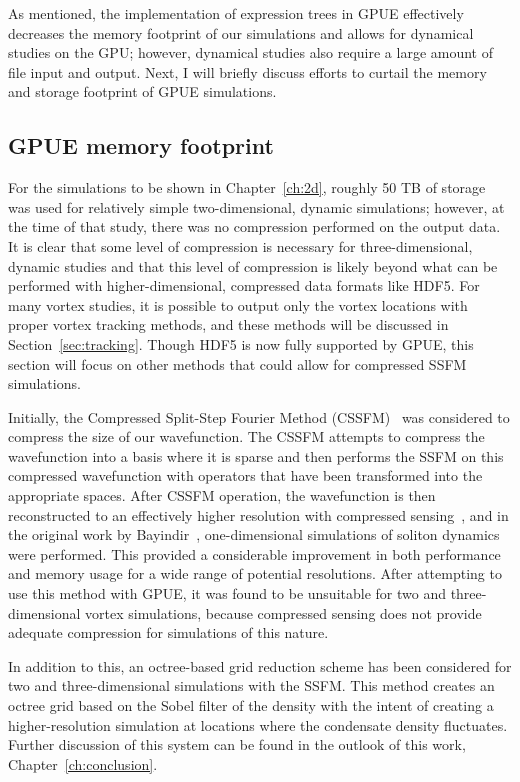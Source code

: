 As mentioned, the implementation of expression trees in GPUE effectively decreases the memory footprint of our simulations and allows for dynamical studies on the GPU; however, dynamical studies also require a large amount of file input and output.
Next, I will briefly discuss efforts to curtail the memory and storage footprint of GPUE simulations.

\subsection{GPUE memory footprint}

For the simulations to be shown in Chapter~\ref{ch:2d}, roughly 50 TB of storage was used for relatively simple two-dimensional, dynamic simulations; however, at the time of that study, there was no compression performed on the output data.
It is clear that some level of compression is necessary for three-dimensional, dynamic studies and that this level of compression is likely beyond what can be performed with higher-dimensional, compressed data formats like HDF5.
For many vortex studies, it is possible to output only the vortex locations with proper vortex tracking methods, and these methods will be discussed in Section~\ref{sec:tracking}.
Though HDF5 is now fully supported by GPUE, this section will focus on other methods that could allow for compressed SSFM simulations.

Initially, the Compressed Split-Step Fourier Method (CSSFM)~\cite{bayindir2015} was considered to compress the size of our wavefunction.
The CSSFM attempts to compress the wavefunction into a basis where it is sparse and then performs the SSFM on this compressed wavefunction with operators that have been transformed into the appropriate spaces.
After CSSFM operation, the wavefunction is then reconstructed to an effectively higher resolution with compressed sensing~\cite{davenport2012}, and 
in the original work by Bayindir~\cite{bayindir2015}, one-dimensional simulations of soliton dynamics were performed.
This provided a considerable improvement in both performance and memory usage for a wide range of potential resolutions.
After attempting to use this method with GPUE, it was found to be unsuitable for two and three-dimensional vortex simulations, because compressed sensing does not provide adequate compression for simulations of this nature.

In addition to this, an octree-based grid reduction scheme has been considered for two and three-dimensional simulations with the SSFM.
This method creates an octree grid based on the Sobel filter of the density with the intent of creating a higher-resolution simulation at locations where the condensate density fluctuates.
Further discussion of this system can be found in the outlook of this work, Chapter~\ref{ch:conclusion}.

